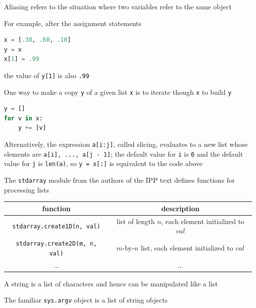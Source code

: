 \documentclass[8pt,a4paper,compress]{beamer}
\begin{document}
\begin{frame}[fragile]
\pause

Aliasing refers to the situation where two variables refer to the same object

\pause
\bigskip

For example, after the assignment statements
\begin{lstlisting}[language=Python]
x = [.30, .60, .10]
y = x
x[1] = .99
\end{lstlisting}
the value of \lstinline{y[1]} is also \lstinline{.99}

\pause
\bigskip

One way to make a copy \lstinline{y} of a given list \lstinline{x} is to iterate though \lstinline{x} to build \lstinline{y}
\begin{lstlisting}[language=Python]
y = []
for v in x:
    y += [v]
\end{lstlisting}

\pause
\bigskip

Alternatively, the expression \lstinline{a[i:j]}, called slicing,  evaluates to a new list whose elements are \lstinline{a[i], ..., a[j - 1]}; the default value for \lstinline{i} is \lstinline{0} and the default value for \lstinline{j} is \lstinline{len(a)}, so \lstinline{y = x[:]} is equivalent to the code above

\pause
\bigskip

The \lstinline{stdarray} module from the authors of the IPP text defines functions for processing lists

\begin{center}
\begin{tabular}{cc}
function & description \\ \hline
\lstinline$stdarray.create1D(n, val)$ & list of length $n$, each element initialized to $val$ \\
\lstinline$stdarray.create2D(m, n, val)$ & $m$-by-$n$ list, each element initialized to $val$ \\
$\dots$ & $\dots$
\end{tabular} 
\end{center}

\pause

A string is a list of characters and hence can be manipulated like a list

\pause
\bigskip

The familiar \lstinline{sys.argv} object is a list of string objects
\end{frame}
\end{document}

